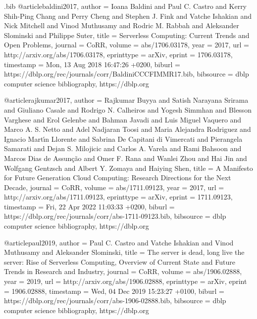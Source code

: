\RequirePackage{filecontents}
\begin{filecontents}{\jobname.bib}
@article{baldini2017,
  author    = {Ioana Baldini and
               Paul C. Castro and
               Kerry Shih{-}Ping Chang and
               Perry Cheng and
               Stephen J. Fink and
               Vatche Ishakian and
               Nick Mitchell and
               Vinod Muthusamy and
               Rodric M. Rabbah and
               Aleksander Slominski and
               Philippe Suter},
  title     = {Serverless Computing: Current Trends and Open Problems},
  journal   = {CoRR},
  volume    = {abs/1706.03178},
  year      = {2017},
  url       = {http://arxiv.org/abs/1706.03178},
  eprinttype = {arXiv},
  eprint    = {1706.03178},
  timestamp = {Mon, 13 Aug 2018 16:47:26 +0200},
  biburl    = {https://dblp.org/rec/journals/corr/BaldiniCCCFIMMR17.bib},
  bibsource = {dblp computer science bibliography, https://dblp.org}
}

@article{rajkumar2017,
  author    = {Rajkumar Buyya and
               Satish Narayana Srirama and
               Giuliano Casale and
               Rodrigo N. Calheiros and
               Yogesh Simmhan and
               Blesson Varghese and
               Erol Gelenbe and
               Bahman Javadi and
               Luis Miguel Vaquero and
               Marco A. S. Netto and
               Adel Nadjaran Toosi and
               Maria Alejandra Rodriguez and
               Ignacio Mart{\'{\i}}n Llorente and
               Sabrina De Capitani di Vimercati and
               Pierangela Samarati and
               Dejan S. Milojicic and
               Carlos A. Varela and
               Rami Bahsoon and
               Marcos Dias de Assun{\c{c}}{\~{a}}o and
               Omer F. Rana and
               Wanlei Zhou and
               Hai Jin and
               Wolfgang Gentzsch and
               Albert Y. Zomaya and
               Haiying Shen},
  title     = {A Manifesto for Future Generation Cloud Computing: Research Directions
               for the Next Decade},
  journal   = {CoRR},
  volume    = {abs/1711.09123},
  year      = {2017},
  url       = {http://arxiv.org/abs/1711.09123},
  eprinttype = {arXiv},
  eprint    = {1711.09123},
  timestamp = {Fri, 22 Apr 2022 11:03:33 +0200},
  biburl    = {https://dblp.org/rec/journals/corr/abs-1711-09123.bib},
  bibsource = {dblp computer science bibliography, https://dblp.org}
}

@article{paul2019,
  author    = {Paul C. Castro and
               Vatche Ishakian and
               Vinod Muthusamy and
               Aleksander Slominski},
  title     = {The server is dead, long live the server: Rise of Serverless Computing,
               Overview of Current State and Future Trends in Research and Industry},
  journal   = {CoRR},
  volume    = {abs/1906.02888},
  year      = {2019},
  url       = {http://arxiv.org/abs/1906.02888},
  eprinttype = {arXiv},
  eprint    = {1906.02888},
  timestamp = {Wed, 04 Dec 2019 15:23:27 +0100},
  biburl    = {https://dblp.org/rec/journals/corr/abs-1906-02888.bib},
  bibsource = {dblp computer science bibliography, https://dblp.org}
}


\end{filecontents}
